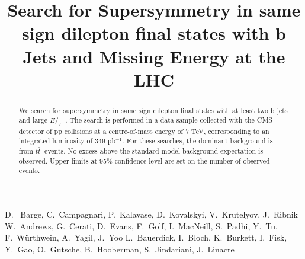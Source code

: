 \documentclass{cmspaper}
\newcommand{\met} {\ensuremath{E\!\!\!\!/_T}}
\newcommand{\ttbar} {\ensuremath{t\bar{t}~}}
\begin{document}
%
\begin{titlepage}
\title{Search for Supersymmetry in same sign dilepton final states with b Jets and Missing Energy at the LHC}

  \begin{Authlist}
    D.~ Barge, C.~Campagnari, P.~Kalavase, D.~Kovalskyi, V.~Krutelyov, J.~Ribnik
    W.~Andrews, G.~Cerati, D.~Evans, F.~Golf, I.~MacNeill, S.~Padhi, Y.~Tu, F.~W\"urthwein, A.~Yagil, J.~Yoo
    L.~Bauerdick, I.~Bloch, K.~Burkett, I.~Fisk, Y.~Gao, O.~Gutsche, B.~Hooberman, S.~Jindariani, J.~Linacre
  \end{Authlist}

\begin{abstract}
We search for supersymmetry in same sign dilepton final states with at least two b jets 
and large \met~. The search is performed in a data sample collected with the CMS detector
of pp collisions at a centre-of-mass energy of 7 TeV, corresponding to an integrated
luminosity of $349$ pb$^{-1}$. For these searches, the dominant background is from \ttbar 
events. No excess above the standard model background expectation is observed.
Upper limits at 95\% confidence level are set on the number of observed events.
\end{abstract}
\end{titlepage}


%





\clearpage

\end{document}
